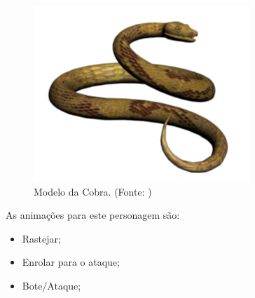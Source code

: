\begin{itemize}
\begin{figure}[H]
 \centering
 \includegraphics[scale=0.7]{Imagens/cobra01.png}
 \caption{Modelo da Cobra. (Fonte: \cite{bib:cobra01})}
\label{img:cobra}
\end{figure}


As animações para este personagem são:
\begin{itemize}
\item Rastejar;
\item Enrolar para o ataque;
\item Bote/Ataque;
\end{itemize}
\end{itemize}

